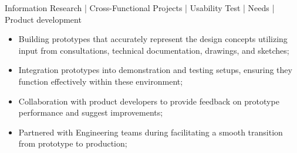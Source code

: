 {Information Research | Cross-Functional Projects | Usability Test | Needs | Product development 
\newline{}
\begin{itemize}
\item Building prototypes that accurately represent the design concepts utilizing input from consultations, technical documentation, drawings, and sketches;
\item Integration prototypes into demonstration and testing setups, ensuring they function effectively within these environment;
\item Collaboration with product developers to provide feedback on prototype performance and suggest improvements;
\item Partnered with Engineering teams during facilitating a smooth transition from prototype to production;
\end{itemize}}